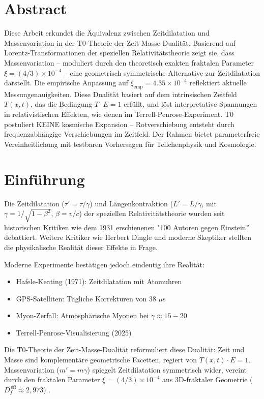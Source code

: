 \section*{Abstract}
		Diese Arbeit erkundet die Äquivalenz zwischen Zeitdilatation und Massenvariation in der T0-Theorie der Zeit-Masse-Dualität. Basierend auf Lorentz-Transformationen der speziellen Relativitätstheorie zeigt sie, dass Massenvariation – moduliert durch den theoretisch exakten fraktalen Parameter $\xi = (4/3) \times 10^{-4}$ – eine geometrisch symmetrische Alternative zur Zeitdilatation darstellt. Die empirische Anpassung auf $\xi_{\text{emp}} = 4.35 \times 10^{-4}$ reflektiert aktuelle Messungenauigkeiten. Diese Dualität basiert auf dem intrinsischen Zeitfeld $T(x,t)$, das die Bedingung $T \cdot E = 1$ erfüllt, und löst interpretative Spannungen in relativistischen Effekten, wie denen im Terrell-Penrose-Experiment. T0 postuliert KEINE kosmische Expansion – Rotverschiebung entsteht durch frequenzabhängige Verschiebungen im Zeitfeld. Der Rahmen bietet parameterfreie Vereinheitlichung mit testbaren Vorhersagen für Teilchenphysik und Kosmologie.

	
	\section{Einführung}
	Die Zeitdilatation ($\tau' = \tau / \gamma$) und Längenkontraktion ($L' = L / \gamma$, mit $\gamma = 1 / \sqrt{1 - \beta^2}$, $\beta = v/c$) der speziellen Relativitätstheorie wurden seit historischen Kritiken wie dem 1931 erschienenen "100 Autoren gegen Einstein'' \cite{hundert1931} debattiert. Weitere Kritiker wie Herbert Dingle \cite{dingle1972} und moderne Skeptiker \cite{gift2010} stellten die physikalische Realität dieser Effekte in Frage. 
	
	Moderne Experimente bestätigen jedoch eindeutig ihre Realität:
	\begin{itemize}
		\item Hafele-Keating (1971): Zeitdilatation mit Atomuhren \cite{hafele1972}
		\item GPS-Satelliten: Tägliche Korrekturen von 38 $\mu$s \cite{ashby2003}
		\item Myon-Zerfall: Atmosphärische Myonen bei $\gamma \approx 15-20$ \cite{rossi1941}
		\item Terrell-Penrose-Visualisierung (2025) \cite{terrell2025}
	\end{itemize}
	
	Die T0-Theorie der Zeit-Masse-Dualität \cite{pascher2025t0} reformuliert diese Dualität: Zeit und Masse sind komplementäre geometrische Facetten, regiert von $T(x,t) \cdot E = 1$. Massenvariation ($m' = m \gamma$) spiegelt Zeitdilatation symmetrisch wider, vereint durch den fraktalen Parameter $\xi = (4/3) \times 10^{-4}$ aus 3D-fraktaler Geometrie ($D_f^{\,\text{eff}} \approx 2{,}973$) \cite{pascher2025si, mandelbrot1982}. 
	
